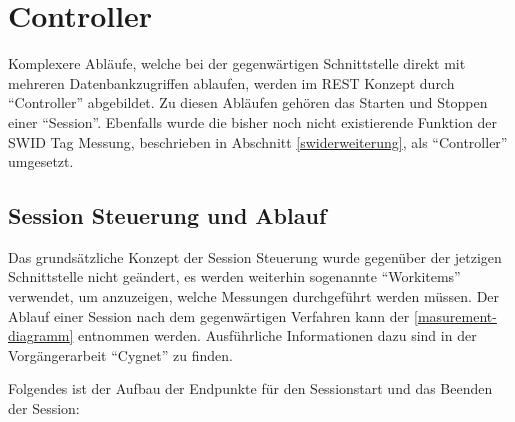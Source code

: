 \section{Controller}
Komplexere Abläufe, welche bei der gegenwärtigen Schnittstelle direkt mit
mehreren Datenbankzugriffen ablaufen, werden im REST Konzept durch
\enquote{Controller} abgebildet. Zu diesen Abläufen gehören das Starten und
Stoppen einer \enquote{Session}. Ebenfalls wurde die bisher noch nicht
existierende Funktion der SWID Tag Messung, beschrieben in Abschnitt
\ref{swiderweiterung}, als \enquote{Controller} umgesetzt.

\subsection{Session Steuerung und Ablauf}
Das grundsätzliche Konzept der Session Steuerung wurde gegenüber der jetzigen
Schnittstelle nicht geändert, es werden weiterhin sogenannte \enquote{Workitems}
verwendet, um anzuzeigen, welche Messungen durchgeführt werden müssen. Der Ablauf
einer Session nach dem gegenwärtigen Verfahren kann der 
\autoref{masurement-diagramm} entnommen werden. Ausführliche
Informationen dazu sind in der Vorgängerarbeit
\enquote{Cygnet}\cite{cygnet:2013} zu finden.

Folgendes ist der Aufbau der Endpunkte für den Sessionstart und das Beenden der
Session:

